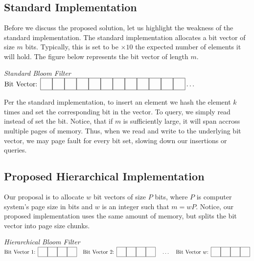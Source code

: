 \newcommand{\sep}{\hspace*{0.15in}}
\newcommand\cell{%
    \fbox{\rule{0.15in}{0pt}\rule[-0.5ex]{0pt}{0.15in}}}

\subsection{Standard Implementation}
Before we discuss the proposed solution, let us highlight the weakness of the standard implementation.
The standard implementation allocates a bit vector of size $m$ bits. Typically, this is set to be $\times 10$ the expected number of elements it will hold.
The figure below represents the bit vector of length $m$.

\begin{center}
    \textit{Standard Bloom Filter}
    \vspace{10pt}\\
    $\text{Bit Vector: } \cell\cell\cell\cell\cell\cell\cell\cell\cell\cell\cell\cell \ldots$
    \vspace{10pt}\\
\end{center}

Per the standard implementation, to insert an element we hash the element $k$ times and set the corresponding bit in the vector.
To query, we simply read instead of set the bit.
Notice, that if $m$ is sufficiently large, it will span accross multiple pages of memory. 
Thus, when we read and write to the underlying bit vector, we may page fault for every bit set, slowing down our insertions or queries.

\subsection{Proposed Hierarchical Implementation}
Our proposal is to allocate $w$ bit vectors of size $P$ bits, where $P$ is computer system's page size in bits and $w$ is an integer such that $m = w P$.
Notice, our proposed implementation uses the same amount of memory, but  splits the bit vector into page size chunks.

\begin{center}
    \textit{Hierarchical Bloom Filter}
    \vspace{10pt}\\
    $\text{Bit Vector 1: }\cell\cell\cell\cell \sep \text{Bit Vector 2: }\cell\cell\cell\cell \sep \ldots \sep \text{Bit Vector $w$: }\cell\cell\cell\cell$
    \vspace{10pt}\\
\end{center}

